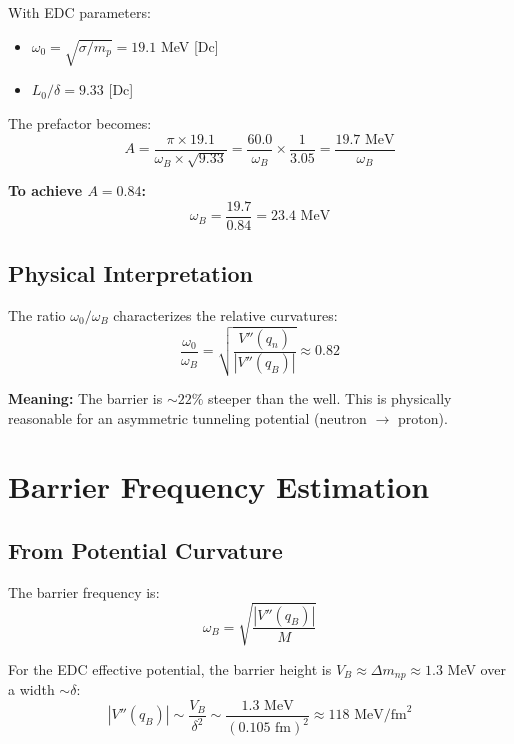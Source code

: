 \documentclass[11pt]{article}
\newcommand{\tagDc}{{\small\textsf{[Dc]}}}
\begin{document}
With EDC parameters:
\begin{itemize}
    \item $\omega_0 = \sqrt{\sigma/m_p} = 19.1$ MeV \tagDc{}
    \item $L_0/\delta = 9.33$ \tagDc{}
\end{itemize}

The prefactor becomes:
\begin{equation}
    A = \frac{\pi \times 19.1}{\omega_B \times \sqrt{9.33}} = \frac{60.0}{\omega_B} \times \frac{1}{3.05} = \frac{19.7 \text{ MeV}}{\omega_B}
\end{equation}

\textbf{To achieve $A = 0.84$:}
\begin{equation}
    \omega_B = \frac{19.7}{0.84} = 23.4 \text{ MeV}
\end{equation}

\subsection{Physical Interpretation}

The ratio $\omega_0/\omega_B$ characterizes the relative curvatures:
\begin{equation}
    \frac{\omega_0}{\omega_B} = \sqrt{\frac{V''(q_n)}{|V''(q_B)|}} \approx 0.82
\end{equation}

\textbf{Meaning:} The barrier is $\sim 22\%$ steeper than the well. This is physically reasonable for an asymmetric tunneling potential (neutron $\to$ proton).

\section{Barrier Frequency Estimation}

\subsection{From Potential Curvature}

The barrier frequency is:
\begin{equation}
    \omega_B = \sqrt{\frac{|V''(q_B)|}{M}}
\end{equation}

For the EDC effective potential, the barrier height is $V_B \approx \Delta m_{np} \approx 1.3$ MeV over a width $\sim \delta$:
\begin{equation}
    |V''(q_B)| \sim \frac{V_B}{\delta^2} \sim \frac{1.3 \text{ MeV}}{(0.105 \text{ fm})^2} \approx 118 \text{ MeV/fm}^2
\end{equation}
\end{document}
